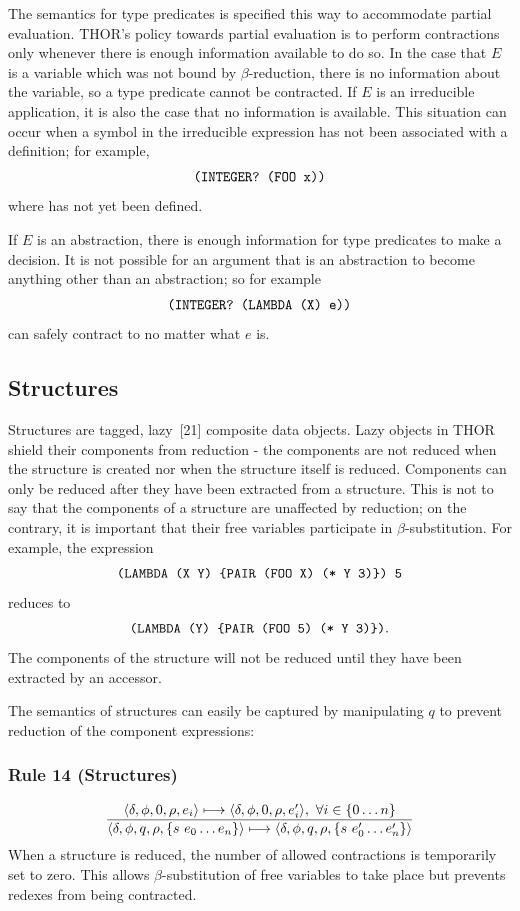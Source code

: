 The semantics for type predicates is specified this way to accommodate partial
evaluation. THOR's policy towards partial evaluation is to perform contractions
only whenever there is enough information available to do so. In the case that
\(E\) is a variable which was not bound by \(\beta\)-reduction, there is no
information about the variable, so a type predicate cannot be contracted. If
\(E\) is an irreducible application, it is also the case that no information is
available. This situation can occur when a symbol in the irreducible expression
has not been associated with a definition; for example,
\[
\texttt{(INTEGER? (FOO x))}
\]
where  has not yet been defined.

If \(E\) is an abstraction, there is enough information for type predicates to
make a decision. It is not possible for an argument that is an abstraction to
become anything other than an abstraction; so for example
\[
\texttt{(INTEGER? (LAMBDA (X) e))}
\]
can safely contract to  no matter what \(e\) is.

\subsection{Structures}

Structures are tagged, lazy~[21] composite data objects. Lazy objects in THOR
shield their components from reduction - the components are not reduced when
the structure is created nor when the structure itself is reduced. Components
can only be reduced after they have been extracted from a structure. This is not
to say that the components of a structure are unaffected by reduction; on the
contrary, it is important that their free variables participate in
\(\beta\)-substitution. For example, the expression
\[
\texttt{(LAMBDA (X Y) \{PAIR (FOO X) (* Y 3)\}) 5}
\]
reduces to
\[
\texttt{(LAMBDA (Y) \{PAIR (FOO 5) (* Y 3)\})}.
\]
The components of the  structure will not be reduced until they have
been extracted by an accessor.

The semantics of structures can easily be captured by manipulating \(q\) to
prevent reduction of the component expressions:

\subsubsection*{Rule 14 (Structures)}
\[
\frac{
\langle \delta,\phi,0,\rho,e_i\rangle\longmapsto
\langle \delta,\phi,0,\rho,e'_i\rangle,\ \forall i\in\{0\ldots n\}
}{
\langle \delta,\phi,q,\rho,\{s\ e_0\ldots e_n\}\rangle\longmapsto
\langle \delta,\phi,q,\rho,\{s\ e'_0\ldots e'_n\}\rangle
}
\]
When a structure is reduced, the number of allowed contractions is temporarily
set to zero. This allows \(\beta\)-substitution of free variables to take place
but prevents redexes from being contracted.

